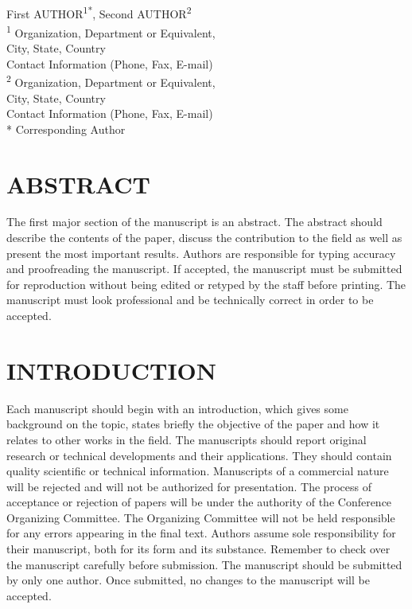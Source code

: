 \documentclass[10pt]{extarticle}
\begin{document}
	
\begin{center}
\vspace{0.2in}
\\[12pt]

{\fontsize{11pt}{1.2em}\selectfont
First AUTHOR\textsuperscript{1*}, Second AUTHOR\textsuperscript{2}
\\[10pt]
\textsuperscript{1} Organization, Department or Equivalent,\\
City, State, Country\\
Contact Information (Phone, Fax, E-mail)
\\[10pt]
\textsuperscript{2} Organization, Department or Equivalent,\\
City, State, Country\\
Contact Information (Phone, Fax, E-mail)\\[10pt]
* Corresponding Author
\\[0.6in]
}
\end{center}

\section*{ABSTRACT}

The first major section of the manuscript is an abstract.  The abstract should describe the contents of the paper, discuss the contribution to the field as well as present the most important results.  Authors are responsible for typing accuracy and proofreading the manuscript.  If accepted, the manuscript must be submitted for reproduction without being edited or retyped by the staff before printing.  The manuscript must look professional and be technically correct in order to be accepted.

\section{INTRODUCTION}

Each manuscript should begin with an introduction, which gives some background on the topic, states briefly the objective of the paper and how it relates to other works in the field.  The manuscripts should report original research or technical developments and their applications.  They should contain quality scientific or technical information.  Manuscripts of a commercial nature will be rejected and will not be authorized for presentation.  The process of acceptance or rejection of papers will be under the authority of the Conference Organizing Committee.  The Organizing Committee will not be held responsible for any errors appearing in the final text.  Authors assume sole responsibility for their manuscript, both for its form and its substance.  Remember to check over the manuscript carefully before submission.  The manuscript should be submitted by only one author. Once submitted, no changes to the manuscript will be accepted. 
\end{document}
